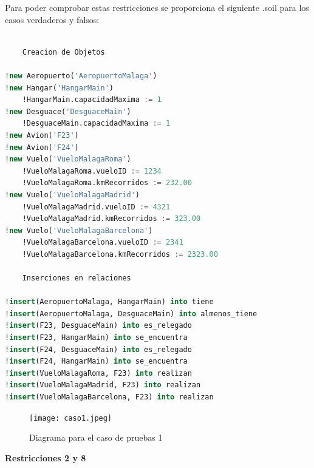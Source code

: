 \documentclass[12pt.a4paper]{article}
\begin{document}
Para poder comprobar estas restricciones se proporciona el siguiente .soil para los casos verdaderos y falsos:

\vspace{2.0 cm}
\begin{lstlisting}[style = useNormal,language=SQL, caption={Codigo de pruebas 1}] 

    Creacion de Objetos
    
!new Aeropuerto('AeropuertoMalaga')
!new Hangar('HangarMain')
    !HangarMain.capacidadMaxima := 1
!new Desguace('DesguaceMain')
    !DesguaceMain.capacidadMaxima := 1
!new Avion('F23')
!new Avion('F24')
!new Vuelo('VueloMalagaRoma')
    !VueloMalagaRoma.vueloID := 1234
    !VueloMalagaRoma.kmRecorridos := 232.00
!new Vuelo('VueloMalagaMadrid')
    !VueloMalagaMadrid.vueloID := 4321
    !VueloMalagaMadrid.kmRecorridos := 323.00
!new Vuelo('VueloMalagaBarcelona')
    !VueloMalagaBarcelona.vueloID := 2341
    !VueloMalagaBarcelona.kmRecorridos := 2323.00
    
    Inserciones en relaciones
    
!insert(AeropuertoMalaga, HangarMain) into tiene
!insert(AeropuertoMalaga, DesguaceMain) into almenos_tiene
!insert(F23, DesguaceMain) into es_relegado
!insert(F23, HangarMain) into se_encuentra
!insert(F24, DesguaceMain) into es_relegado
!insert(F24, HangarMain) into se_encuentra
!insert(VueloMalagaRoma, F23) into realizan
!insert(VueloMalagaMadrid, F23) into realizan
!insert(VueloMalagaBarcelona, F23) into realizan

\end{lstlisting}
\begin{figure}[H]
     \texttt{[image: caso1.jpeg]}
     \caption{Diagrama para el caso de pruebas 1}
     \label{Diagrama del sistema de aviacion}
\end{figure}
\vspace{0.5 cm}
\textbf{Restricciones 2 y 8}
\end{document}
